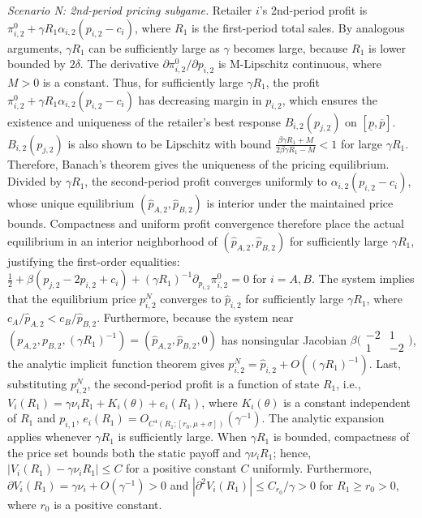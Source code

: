\documentclass[nonblindrev,copyedit]{informs1}
\begin{document}
\begin{APPENDICES}
\textit{Scenario N: 2nd-period pricing subgame. }
Retailer $i$'s 2nd-period profit is $\pi_{i,2}^0+\gamma R_1\alpha_{i,2}(p_{i,2}-c_i)$, where $R_1$ is the first-period total sales. By analogous arguments, $\gamma R_1$ can be sufficiently large as $\gamma$ becomes large, because $R_1$ is lower bounded by $2 \delta$. The derivative $\partial \pi_{i,2}^0/ \partial p_{i,2}$ is M-Lipschitz continuous, where $M > 0$ is a constant. Thus, for sufficiently large $\gamma R_1$, the profit $\pi_{i,2}^0+\gamma R_1 \alpha_{i,2}(p_{i,2}-c_i)$ has decreasing margin in $p_{i,2}$, which ensures the existence and uniqueness of the retailer's best response $B_{i,2}(p_{j,2})$ on $[\underline{p}, \overline{p}]$. $B_{i,2}(p_{j,2})$ is also shown to be Lipschitz with bound $\frac{\beta \gamma R_1 + M}{2\beta \gamma R_1 - M} < 1$ for large $\gamma R_1$. Therefore, Banach’s theorem gives the uniqueness of the pricing equilibrium. Divided by $\gamma R_1$, the second-period profit converges uniformly to $\alpha_{i,2} (p_{i,2} - c_i)$, whose unique equilibrium $(\widehat{p}_{A,2},\widehat{p}_{B,2})$ is interior under the maintained price bounds. Compactness and uniform profit convergence therefore place the actual equilibrium in an interior neighborhood of $(\widehat{p}_{A,2},\widehat{p}_{B,2})$ for sufficiently large $\gamma R_1$, justifying the first-order equalities: $\tfrac12+\beta(p_{j,2}-2p_{i,2}+c_i)+(\gamma R_1)^{-1}\partial_{p_{i,2}}\pi_{i,2}^0 =0$ for $i = A, B$. The system implies that the equilibrium price $p^N_{i,2}$ converges to $\widehat p_{i,2}$ for sufficiently large $\gamma R_1$, where $c_A/\widehat p_{A,2}<c_B/\widehat p_{B,2}$. Furthermore, because the system near $(p_{A,2},p_{B,2},(\gamma R_{1})^{-1})=(\widehat p_{A,2},\widehat p_{B,2},0)$ has nonsingular Jacobian $\beta\bigl(\begin{smallmatrix}-2&1\\1&-2\end{smallmatrix}\bigr)$, the analytic implicit function theorem gives $p_{i,2}^N=\widehat p_{i,2}+O((\gamma R_{1})^{-1})$. Last, substituting $p_{i,2}^N$, the second-period profit is a function of state $R_{1}$, i.e., $V_i(R_{1})=\gamma\nu_i R_{1}+K_i(\theta)+e_i(R_{1})$, where $K_i(\theta)$ is a constant independent of $R_1$ and $p_{i,1}$, $e_i(R_1) = O_{C^4(R_1;[r_0,\mu+\sigma])}(\gamma^{-1})$. The analytic expansion applies whenever $\gamma R_1$ is sufficiently large. When $\gamma R_1$ is bounded, compactness of the price set bounds both the static payoff and $\gamma \nu_i R_1$; hence, $|V_i(R_{1}) - \gamma\nu_i R_{1}| \leq C$ for a positive constant $C$ uniformly. Furthermore, $\partial V_i(R_{1}) = \gamma\nu_i + O(\gamma^{-1}) > 0$ and $|\partial^2 V_i(R_{1})| \leq C_{r_0} /\gamma > 0$ for $R_{1} \geq r_0 >0$, where $r_0$ is a positive constant.


\end{APPENDICES}
\end{document}
